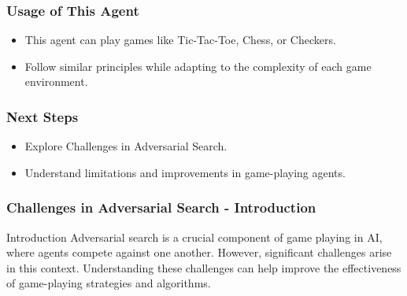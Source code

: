 \documentclass[aspectratio=169]{beamer}
\begin{document}
\begin{frame}[fragile]
    \frametitle{Usage of This Agent}
    \begin{itemize}
        \item This agent can play games like Tic-Tac-Toe, Chess, or Checkers.
        \item Follow similar principles while adapting to the complexity of each game environment.
    \end{itemize}
\end{frame}

\begin{frame}[fragile]
    \frametitle{Next Steps}
    \begin{itemize}
        \item Explore Challenges in Adversarial Search.
        \item Understand limitations and improvements in game-playing agents.
    \end{itemize}
\end{frame}

\begin{frame}[fragile]
    \frametitle{Challenges in Adversarial Search - Introduction}
    \begin{block}{Introduction}
        Adversarial search is a crucial component of game playing in AI, where agents compete against one another. However, significant challenges arise in this context. Understanding these challenges can help improve the effectiveness of game-playing strategies and algorithms.
    \end{block}
\end{frame}
\end{document}

